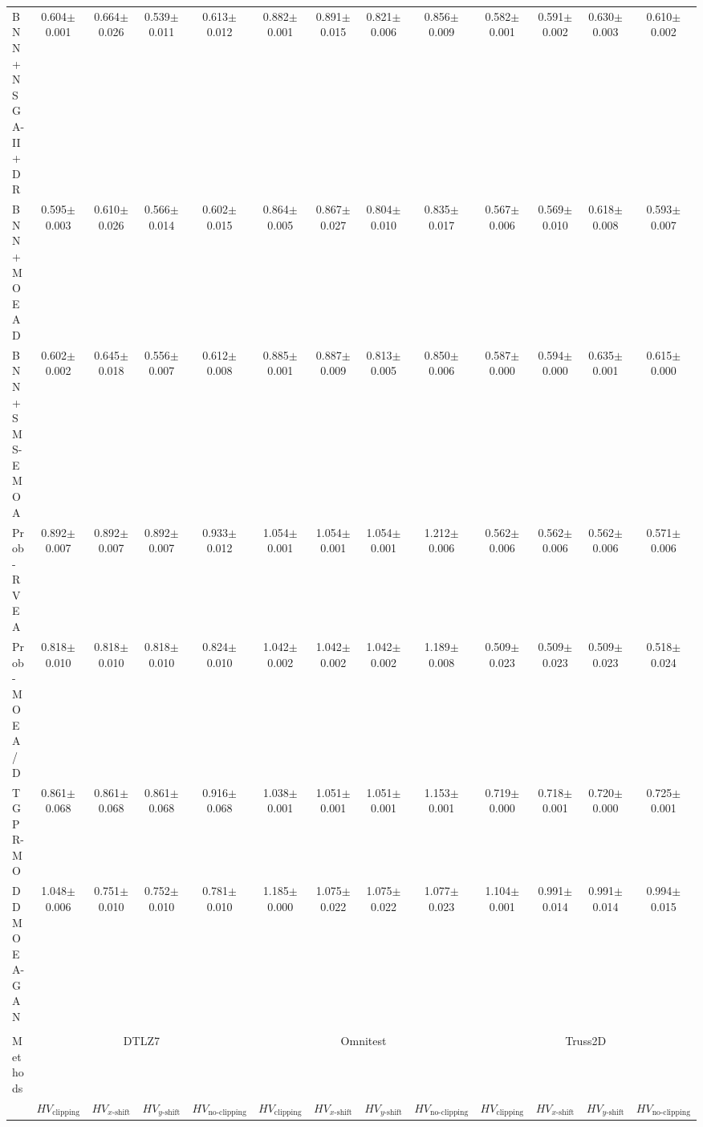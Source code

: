 \begin{table}[htbp]
{\begin{tabular}{l c c c c c c c c c c c c}
BNN+NSGA-II+DR & 0.604$\pm$0.001 & 0.664$\pm$0.026 & 0.539$\pm$0.011 & 0.613$\pm$0.012 & 0.882$\pm$0.001 & 0.891$\pm$0.015 & 0.821$\pm$0.006 & 0.856$\pm$0.009 & 0.582$\pm$0.001 & 0.591$\pm$0.002 & 0.630$\pm$0.003 & 0.610$\pm$0.002 \\
BNN+MOEAD & 0.595$\pm$0.003 & 0.610$\pm$0.026 & 0.566$\pm$0.014 & 0.602$\pm$0.015 & 0.864$\pm$0.005 & 0.867$\pm$0.027 & 0.804$\pm$0.010 & 0.835$\pm$0.017 & 0.567$\pm$0.006 & 0.569$\pm$0.010 & 0.618$\pm$0.008 & 0.593$\pm$0.007 \\
BNN+SMS-EMOA & 0.602$\pm$0.002 & 0.645$\pm$0.018 & 0.556$\pm$0.007 & 0.612$\pm$0.008 & 0.885$\pm$0.001 & 0.887$\pm$0.009 & 0.813$\pm$0.005 & 0.850$\pm$0.006 & 0.587$\pm$0.000 & 0.594$\pm$0.000 & 0.635$\pm$0.001 & 0.615$\pm$0.000 \\
Prob-RVEA & 0.892$\pm$0.007 & 0.892$\pm$0.007 & 0.892$\pm$0.007 & 0.933$\pm$0.012 & 1.054$\pm$0.001 & 1.054$\pm$0.001 & 1.054$\pm$0.001 & 1.212$\pm$0.006 & 0.562$\pm$0.006 & 0.562$\pm$0.006 & 0.562$\pm$0.006 & 0.571$\pm$0.006 \\
Prob-MOEA/D & 0.818$\pm$0.010 & 0.818$\pm$0.010 & 0.818$\pm$0.010 & 0.824$\pm$0.010 & 1.042$\pm$0.002 & 1.042$\pm$0.002 & 1.042$\pm$0.002 & 1.189$\pm$0.008 & 0.509$\pm$0.023 & 0.509$\pm$0.023 & 0.509$\pm$0.023 & 0.518$\pm$0.024 \\
TGPR-MO & 0.861$\pm$0.068 & 0.861$\pm$0.068 & 0.861$\pm$0.068 & 0.916$\pm$0.068 & 1.038$\pm$0.001 & 1.051$\pm$0.001 & 1.051$\pm$0.001 & 1.153$\pm$0.001 & 0.719$\pm$0.000 & 0.718$\pm$0.001 & 0.720$\pm$0.000 & 0.725$\pm$0.001 \\
DDMOEA-GAN & 1.048$\pm$0.006 & 0.751$\pm$0.010 & 0.752$\pm$0.010 & 0.781$\pm$0.010 & 1.185$\pm$0.000 & 1.075$\pm$0.022 & 1.075$\pm$0.022 & 1.077$\pm$0.023 & 1.104$\pm$0.001 & 0.991$\pm$0.014 & 0.991$\pm$0.014 & 0.994$\pm$0.015 \\
\hline
\multicolumn{13}{c}{} \\
\hline
Methods & \multicolumn{4}{c}{DTLZ7} & \multicolumn{4}{c}{Omnitest} & \multicolumn{4}{c}{Truss2D} \\
\cmidrule(lr){2-5} \cmidrule(lr){6-9} \cmidrule(lr){10-13}
 & $HV_{\mathrm{clipping}}$ & $HV_{x\text{-}\mathrm{shift}}$ & $HV_{y\text{-}\mathrm{shift}}$ & $HV_{\mathrm{no\text{-}clipping}}$ & $HV_{\mathrm{clipping}}$ & $HV_{x\text{-}\mathrm{shift}}$ & $HV_{y\text{-}\mathrm{shift}}$ & $HV_{\mathrm{no\text{-}clipping}}$ & $HV_{\mathrm{clipping}}$ & $HV_{x\text{-}\mathrm{shift}}$ & $HV_{y\text{-}\mathrm{shift}}$ & $HV_{\mathrm{no\text{-}clipping}}$ \\

\end{tabular}}
\end{table}
